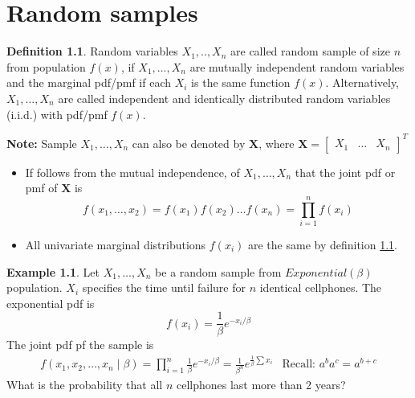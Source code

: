 \documentclass[10pt, twoside, a4paper]{book}
\theoremstyle{definition}
\newtheorem{example}{Example}[chapter]
\newtheorem{definition}{Definition}[chapter]
\begin{document}
\chapter{Random samples}
\begin{definition}
\label{defRandomSamples1}
Random variables $X_1,..,X_n$ are called random sample of size $n$ from
population $f(x)$, if $X_1,\ldots,X_n$ are mutually independent random variables
and the marginal pdf/pmf if each $X_i$ is the same function $f(x)$.
Alternatively, $X_1,\ldots,X_n$ are called independent and identically
distributed random variables (i.i.d.) with pdf/pmf $f(x)$.

\textbf{Note:} Sample $X_1,\ldots,X_n$ can also be denoted by $\bm X$, where
$\bm X = \begin{bmatrix}X_1 & \hdots & X_n \end{bmatrix}^T$
\begin{itemize}
\item If follows from the mutual independence, of $X_1,\ldots,X_n$ that the
joint pdf or pmf of $\bm X$ is
$$f(x_1,\ldots,x_2) = f(x_1)f(x_2)\ldots f(x_n) = \prod_{i=1}^n f(x_i)$$
\item All univariate marginal distributions $f(x_i)$ are the same by definition
\ref{defRandomSamples1}.
\end{itemize}
\begin{example}
Let $X_1,\ldots,X_n$ be a random sample from $Exponential(\beta)$ population.
$X_i$ specifies the time until failure for $n$ identical cellphones. The
exponential pdf is
$$f(x_i) = \frac{1}{\beta}e^{-x_i/\beta}$$ %
The joint pdf pf the sample is
\begin{equation*}
\renewcommand{\arraystretch}{1.6}
\begin{array}{ll}
f(x_1, x_2, \ldots, x_n \mid \beta) = \prod_{i=1}^n
\frac{1}{\beta}e^{-x_i/\beta} = \frac{1}{\beta^n}e^{\frac{1}{\beta}\sum x_i} &
\text{Recall: } a^ba^c=a^{b+c}
\end{array}
\end{equation*}
What is the probability that all $n$ cellphones last more than 2 years?
\end{example}
\end{definition}
\end{document}

